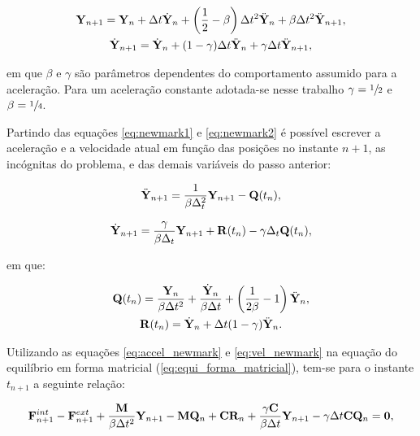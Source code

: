 \begin{gather}
	\mathbf{Y}_{n+1}=\mathbf{Y}_{n} + \Delta t \dot{\mathbf{Y}}_{n}+\left(\frac{1}{2}-\beta\right) \Delta t^2 \ddot{\mathbf{Y}}_{n}+ \beta \Delta t^2 \ddot{\mathbf{Y}}_{n+1},\label{eq:newmark1}\\
	\dot{\mathbf{Y}}_{n+1} = \dot{\mathbf{Y}}_{n}+(1-\gamma)\Delta t \ddot{\mathbf{Y}}_{n}+\gamma \Delta t \ddot{\mathbf{Y}}_{n+1},\label{eq:newmark2}
\end{gather}

\noindent em que $\beta$ e $\gamma$ são parâmetros dependentes do comportamento assumido para a aceleração. Para um aceleração constante adotada-se nesse trabalho $\gamma=\sfrac{1}{2}$ e $\beta=\sfrac{1}{4}$.

Partindo das equações \autoref{eq:newmark1} e \autoref{eq:newmark2} é possível escrever a aceleração e a velocidade atual em função das posições no instante $n+1$, as incógnitas do problema, e das demais variáveis do passo anterior:

\begin{align}
	\ddot{\mathbf{Y}}_{n+1} = \frac{1}{\beta \Delta_{t}^2}\mathbf{Y}_{n+1} - \mathbf{Q}(t_n), \label{eq:accel_newmark}
\end{align}

\begin{align}
	\dot{\mathbf{Y}}_{n+1} = \frac{\gamma}{\beta \Delta_{t}}\mathbf{Y}_{n+1} + \mathbf{R}(t_n) - \gamma \Delta_{t} \mathbf{Q}(t_n), \label{eq:vel_newmark}
\end{align}

\noindent em que:

\begin{gather}
	\mathbf{Q}(t_n) = \frac{\mathbf{Y}_n}{\beta \Delta t^2} + \frac{\dot{\mathbf{Y}}_n}{\beta \Delta t} + \left(\frac{1}{2\beta} -1 \right)\ddot{\mathbf{Y}}_n,\label{eq:Qn}\\
	\mathbf{R}(t_n) = \dot{\mathbf{Y}}_n+\Delta t(1-\gamma)\ddot{\mathbf{Y}}_n.\label{eq:Rn}
\end{gather}

Utilizando as equações \autoref{eq:accel_newmark} e \autoref{eq:vel_newmark} na equação do equilíbrio em forma matricial (\autoref{eq:equi_forma_matricial}), tem-se para o instante $t_{n+1}$ a seguinte relação:

\begin{gather}
	\mathbf{F}^{int}_{n+1}- \mathbf{F}^{ext}_{n+1} + \frac{\mathbf{M}}{\beta \Delta t^2} \mathbf{Y}_{n+1}-\mathbf{M} \mathbf{Q}_n+ \mathbf{C}\mathbf{R}_n + \frac{\gamma \mathbf{C}}{\beta \Delta t}\mathbf{Y}_{n+1} - \gamma\Delta t \mathbf{C}\mathbf{Q}_n = \mathbf{0},
	\label{eq:equilibrio_tn+1}
\end{gather}
  
